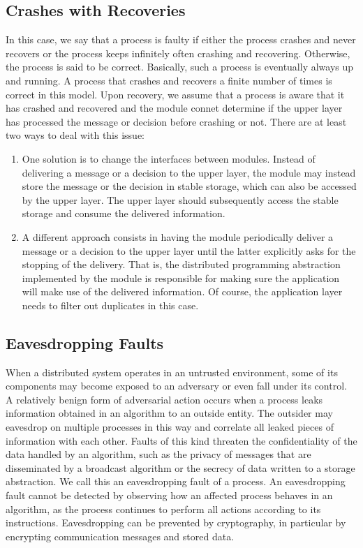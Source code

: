 \documentclass{book}
\begin{document}
\subsection{Crashes with Recoveries}
In this case, we say that a process is faulty if either the process crashes and never recovers or the process keeps infinitely often crashing and recovering. Otherwise, the process is said to be correct.
Basically, such a process is eventually always up and running.
A process that crashes and recovers a finite number of times is correct in this model.
Upon recovery, we assume that a process is aware that it has crashed and recovered and the module connet determine if the upper layer has processed the message or decision before crashing or not.
There are at least two ways to deal with this issue:
\begin{enumerate}
    \item One solution is to change the interfaces between modules. Instead of delivering a message or a decision to the upper layer, the module may instead store the message or the decision in stable storage, which can also be accessed by the upper layer. The upper layer should subsequently access the stable storage and consume the delivered information.
    \item A different approach consists in having the module periodically deliver a message or a decision to the upper layer until the latter explicitly asks for the stopping of the delivery. That is, the distributed programming abstraction implemented by the module is responsible for making sure the application will make use of the delivered information. Of course, the application layer needs to filter out duplicates in this case.
\end{enumerate}

\subsection{Eavesdropping Faults}
When a distributed system operates in an untrusted environment, some of its components may become exposed to an adversary or even fall under its control.
A relatively benign form of adversarial action occurs when a process leaks information obtained in an algorithm to an outside entity.
The outsider may eavesdrop on multiple processes in this way and correlate all leaked pieces of information with each other.
Faults of this kind threaten the confidentiality of the data handled by an algorithm, such as the privacy of messages that are disseminated by a broadcast algorithm or the secrecy of data written to a storage abstraction.
We call this an eavesdropping fault of a process.
An eavesdropping fault cannot be detected by observing how an affected process behaves in an algorithm, as the process continues to perform all actions according to its instructions.
Eavesdropping can be prevented by cryptography, in particular by encrypting communication messages and stored data.
\end{document}
